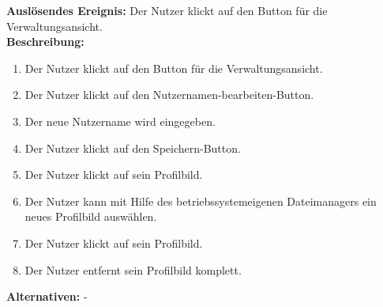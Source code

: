 \documentclass[parskip=full]{scrartcl}
\begin{document}
\textbf{Auslösendes Ereignis:} Der Nutzer klickt auf den Button für die Verwaltungsansicht.\\
\textbf{Beschreibung:}
\begin{enumerate}
    \item Der Nutzer klickt auf den Button für die Verwaltungsansicht.
    \item Der Nutzer klickt auf den Nutzernamen-bearbeiten-Button.
    \item Der neue Nutzername wird eingegeben.
    \item Der Nutzer klickt auf den Speichern-Button.
    \item Der Nutzer klickt auf sein Profilbild.
    \item Der Nutzer kann mit Hilfe des betriebssystemeigenen Dateimanagers ein neues Profilbild auswählen.
    \item Der Nutzer klickt auf sein Profilbild.
    \item Der Nutzer entfernt sein Profilbild komplett.
\end{enumerate}
\textbf{Alternativen:} -
\newpage
\end{document}

